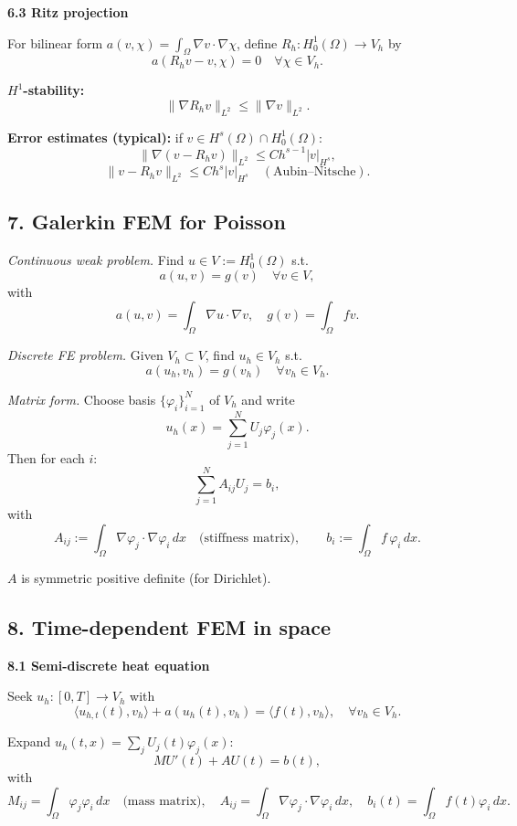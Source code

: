 \textbf{6.3 Ritz projection}

For bilinear form $a(v,\chi)=\int_\Omega \nabla v\cdot\nabla\chi$, define $R_h:H_0^1(\Omega)\to V_h$ by
\[
    a(R_h v - v,\chi) = 0\quad\forall \chi\in V_h.
\]

\textbf{$H^1$-stability:}
\[
    \|\nabla R_h v\|_{L^2} \le \|\nabla v\|_{L^2}.
\]

\textbf{Error estimates (typical):} if $v\in H^s(\Omega)\cap H_0^1(\Omega)$:
\[
    \|\nabla(v - R_h v)\|_{L^2} \le C h^{s-1} |v|_{H^s},
\]
\[
    \|v - R_h v\|_{L^2} \le C h^s |v|_{H^s} \quad(\text{Aubin--Nitsche}).
\]

\subsection*{7. Galerkin FEM for Poisson}

\emph{Continuous weak problem.}
Find $u\in V:=H_0^1(\Omega)$ s.t.
\[
    a(u,v) = g(v)\quad\forall v\in V,
\]
with
\[
    a(u,v) = \int_\Omega \nabla u\cdot\nabla v,
    \quad
    g(v) = \int_\Omega f v.
\]

\emph{Discrete FE problem.}
Given $V_h\subset V$, find $u_h\in V_h$ s.t.
\[
    a(u_h,v_h) = g(v_h)\quad\forall v_h\in V_h.
\]

\emph{Matrix form.}
Choose basis $\{\varphi_i\}_{i=1}^N$ of $V_h$ and write
\[
    u_h(x) = \sum_{j=1}^N U_j \varphi_j(x).
\]
Then for each $i$:
\[
    \sum_{j=1}^N A_{ij}U_j = b_i,
\]
with
\[
    A_{ij} := \int_\Omega \nabla\varphi_j\cdot\nabla\varphi_i\,dx
    \quad\text{(stiffness matrix)},
    \qquad
    b_i := \int_\Omega f\,\varphi_i\,dx.
\]

$A$ is symmetric positive definite (for Dirichlet).

\subsection*{8. Time-dependent FEM in space}

\textbf{8.1 Semi-discrete heat equation}

Seek $u_h:[0,T]\to V_h$ with
\[
    \langle u_{h,t}(t),v_h\rangle + a(u_h(t),v_h) = \langle f(t),v_h\rangle,
    \quad\forall v_h\in V_h.
\]

Expand $u_h(t,x) = \sum_j U_j(t)\varphi_j(x)$:
\[
    M U'(t) + A U(t) = b(t),
\]
with
\[
    M_{ij} = \int_\Omega \varphi_j\varphi_i\,dx \quad\text{(mass matrix)},
    \quad
    A_{ij} = \int_\Omega \nabla\varphi_j\cdot\nabla\varphi_i\,dx,
    \quad
    b_i(t) = \int_\Omega f(t)\varphi_i\,dx.
\]

